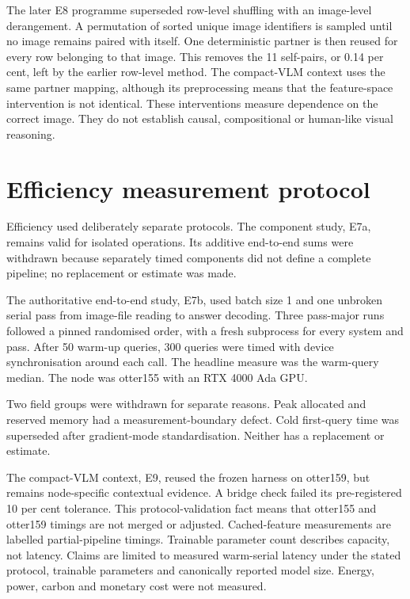 The later E8 programme superseded row-level shuffling with an image-level
derangement. A permutation of sorted unique image identifiers is sampled until
no image remains paired with itself. One deterministic partner is then reused
for every row belonging to that image. This removes the 11 self-pairs, or
0.14 per cent, left by the earlier row-level method. The compact-VLM context
uses the same partner mapping, although its preprocessing means that the
feature-space intervention is not identical. These interventions measure
dependence on the correct image. They do not establish causal, compositional
or human-like visual reasoning.

\section{Efficiency measurement protocol}
\label{sec:ch3-efficiency}
Efficiency used deliberately separate protocols. The component study,
E7a, remains valid for isolated operations. Its additive end-to-end sums were
withdrawn because separately timed components did not define a complete
pipeline; no replacement or estimate was made.

The authoritative end-to-end study, E7b, used batch size 1 and one unbroken
serial pass from image-file reading to answer decoding. Three pass-major runs
followed a pinned randomised order, with a fresh subprocess for every system
and pass. After 50 warm-up queries, 300 queries were timed with device
synchronisation around each call. The headline measure was the warm-query
median. The node was otter155 with an RTX 4000 Ada GPU.

Two field groups were withdrawn for separate reasons. Peak allocated and
reserved memory had a measurement-boundary defect. Cold first-query time was
superseded after gradient-mode standardisation. Neither has a replacement or
estimate.

The compact-VLM context, E9, reused the frozen harness on otter159, but remains
node-specific contextual evidence. A bridge check failed its pre-registered
10 per cent tolerance. This protocol-validation fact means that otter155 and
otter159 timings are not merged or adjusted. Cached-feature measurements are
labelled partial-pipeline timings. Trainable parameter count describes
capacity, not latency. Claims are limited to measured warm-serial latency under
the stated protocol, trainable parameters and canonically reported model size.
Energy, power, carbon and monetary cost were not measured.

